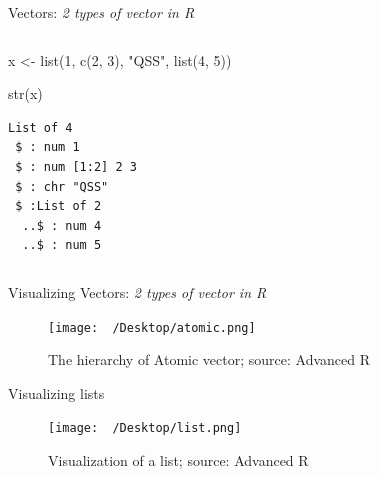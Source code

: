 \documentclass[
  ignorenonframetext,
]{beamer}
\newenvironment{Shaded}{\begin{snugshade}}{\end{snugshade}}
\newcommand{\DecValTok}[1]{\textcolor[rgb]{0.68,0.00,0.00}{#1}}
\newcommand{\FunctionTok}[1]{\textcolor[rgb]{0.28,0.35,0.67}{#1}}
\newcommand{\NormalTok}[1]{\textcolor[rgb]{0.00,0.23,0.31}{#1}}
\newcommand{\OtherTok}[1]{\textcolor[rgb]{0.00,0.23,0.31}{#1}}
\newcommand{\StringTok}[1]{\textcolor[rgb]{0.13,0.47,0.30}{#1}}
\begin{document}
\begin{frame}[fragile]{Vectors: \emph{2 types of vector in R}}
\begin{columns}[c,totalwidth=8em]
\begin{column}{0.5\textwidth}
\begin{Shaded}
\begin{Highlighting}[]
\NormalTok{x }\OtherTok{\textless{}{-}} \FunctionTok{list}\NormalTok{(}\DecValTok{1}\NormalTok{, }
          \FunctionTok{c}\NormalTok{(}\DecValTok{2}\NormalTok{, }\DecValTok{3}\NormalTok{),}
          \StringTok{"QSS"}\NormalTok{,}
          \FunctionTok{list}\NormalTok{(}\DecValTok{4}\NormalTok{, }\DecValTok{5}\NormalTok{))}
          
\FunctionTok{str}\NormalTok{(x)}
\end{Highlighting}
\end{Shaded}

\begin{verbatim}
List of 4
 $ : num 1
 $ : num [1:2] 2 3
 $ : chr "QSS"
 $ :List of 2
  ..$ : num 4
  ..$ : num 5
\end{verbatim}
\end{column}
\end{columns}
\end{frame}

\begin{frame}{Visualizing Vectors: \emph{2 types of vector in R}}
\protect\hypertarget{visualizing-vectors-2-types-of-vector-in-r-1}{}
\begin{figure}

{\centering \texttt{[image: ~/Desktop/atomic.png]}

}

\caption{The hierarchy of Atomic vector; source: Advanced R}

\end{figure}
\end{frame}

\begin{frame}{Visualizing lists}
\protect\hypertarget{visualizing-lists}{}
\begin{figure}

{\centering \texttt{[image: ~/Desktop/list.png]}

}

\caption{Visualization of a list; source: Advanced R}

\end{figure}
\end{frame}
\end{document}
